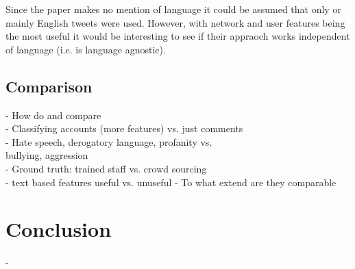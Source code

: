 \documentclass{proseminar}
\begin{document}
Since the paper makes no mention of language it could be assumed that only or mainly English tweets were used. However, with network and user features being the most useful it would be interesting to see if their appraoch works independent of language (i.e. is language agnostic).

\subsection{Comparison}
- How do \cite{Yahoo:2016} and \cite{Twitter:2017} compare\\
\hphantom{- }- Classifying accounts (more features) vs. just comments\\
\hphantom{- }- Hate speech, derogatory language, profanity vs.\\
\hphantom{- - }bullying, aggression\\
\hphantom{- }- Ground truth: trained staff vs. crowd sourcing\\
\hphantom{- }- text based features useful vs. unuseful
- To what extend are they comparable

\section{Conclusion}
-
\end{document}
